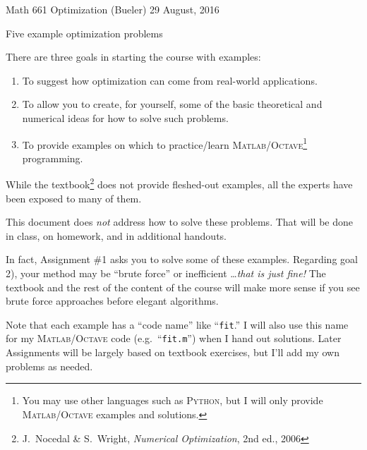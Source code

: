 \documentclass[11pt]{amsart}
\newcommand{\Matlab}{\textsc{Matlab}\xspace}
\newcommand{\Octave}{\textsc{Octave}\xspace}
\newcommand{\Python}{\textsc{Python}\xspace}
\begin{document}
\scriptsize \noindent Math 661 Optimization (Bueler) \hfill 29 August, 2016
\normalsize

\medskip\bigskip
\Large
\centerline{Five example optimization problems}

\bigskip\medskip
\normalsize

\thispagestyle{empty}

There are three goals in starting the course with examples:
\renewcommand{\labelenumi}{\arabic{enumi})}
\begin{enumerate}
\item To suggest how optimization can come from real-world applications.
\item To allow you to create, for yourself, some of the basic theoretical and numerical ideas for how to solve such problems.
\item To provide examples on which to practice/learn \Matlab/\Octave\footnote{You may use other languages such as \Python, but I will only provide \Matlab/\Octave examples and solutions.} programming.
\end{enumerate}
While the textbook\footnote{J.~Nocedal \& S.~Wright, \emph{Numerical Optimization}, 2nd ed., 2006} does not provide fleshed-out examples, all the experts have been exposed to many of them.

This document does \emph{not} address how to solve these problems.  That will be done in class, on homework, and in additional handouts.

In fact, Assignment \#1 asks you to solve some of these examples.  Regarding goal 2), your method may be ``brute force'' or inefficient \dots \emph{that is just fine!}  The textbook and the rest of the content of the course will make more sense if you see brute force approaches before elegant algorithms.

Note that each example has a ``code name'' like ``\texttt{fit}.''  I will also use this name for my \Matlab/\Octave code (e.g.~``\texttt{fit.m}'') when I hand out solutions.  Later Assignments will be largely based on textbook exercises, but I'll add my own problems as needed.
\end{document}
